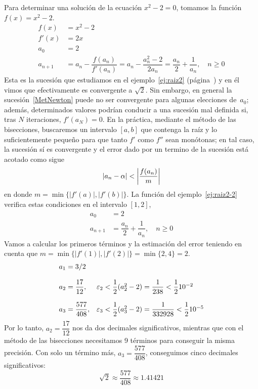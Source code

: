 \begin{ejemplo}\label{ej:raiz2-2}
Para determinar una solución de la ecuación $x^2-2=0$, tomamos la función $f(x)=x^2-2$.
\begin{align*}
f(x) &= x^2-2 \\
f'(x) &= 2x \\
a_0 &= 2 \\
a_{n+1} &= a_n - \dfrac{f(a_n)}{f'(a_n)}= a_n - \dfrac{a_n^2-2}{2a_n} 
=\dfrac{a_n}{2}+\dfrac{1}{a_n},\quad n\ge 0
\end{align*}
Esta es la sucesión que estudiamos en el ejemplo~\ref{ej:raiz2} (página~\pageref{ej:raiz2}) y en él vimos que efectivamente es convergente a $\sqrt2$.
Sin embargo, en general la sucesión~\eqref{MetNewton} puede no ser  convergente para algunas elecciones de~$a_0$; además, determinados valores podrían conducir a una sucesión mal definida si, tras $N$ iteraciones, $f'(a_N)=0$.
En la práctica, mediante el método de las bisecciones, buscaremos un intervalo $[a,b]$ que contenga la raíz y lo suficientemente pequeño para que tanto $f'$ como $f''$ sean monótonas;
en tal caso, la sucesión sí es convergente y el error dado por un termino de la sucesión está acotado como sigue
\[
|a_n-\alpha| <  \left|\frac{f(a_n)}m\right|
\]
en donde $m=\min\{|f'(a)|,|f'(b)|\}$.
La función del ejemplo~\ref{ej:raiz2-2} verifica estas condiciones en el intervalo $[1,2]$,
\begin{align*}
a_0 &= 2 \\
a_{n+1} &= \dfrac{a_n}{2}+\dfrac{1}{a_n},\quad n\ge 0
\end{align*}
Vamos a calcular los primeros términos y la estimación del error teniendo en cuenta que $m=\min\{|f'(1)|,|f'(2)|\}=\min\{2,4\}=2$.
\[
\begin{array}{ll}
a_1=3/2 & \\
\\
a_2=\dfrac{17}{12}, & \varepsilon_2< \dfrac12(a_2^2-2)=\dfrac1{238}
<  \dfrac12 10^{-2} \\
\\
a_3=\dfrac{577}{408}, & \varepsilon_3< \dfrac12(a_3^2-2)=\dfrac1{332928} < \dfrac12 10^{-5}
\end{array}
\]
Por lo tanto, $a_2=\dfrac{17}{12}$ nos da dos decimales significativos, mientras que con el método de las bisecciones necesitamos 9 términos para conseguir la misma precisión.
Con solo un término más, $a_3=\dfrac{577}{408}$, conseguimos cinco decimales significativos:
\[
\sqrt2\approx \dfrac{577}{408}\approx 1.41421\tag*{\fej}
\]
\end{ejemplo}


